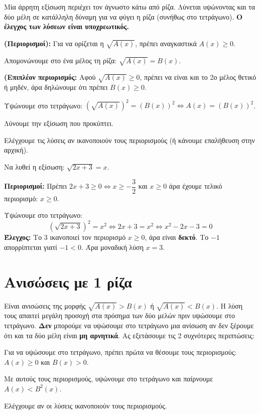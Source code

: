 Μία άρρητη εξίσωση περιέχει τον άγνωστο κάτω από ρίζα.
Λύνεται υψώνοντας και τα δύο μέλη σε κατάλληλη δύναμη για να φύγει η ρίζα (συνήθως στο τετράγωνο). \textbf{Ο έλεγχος των λύσεων είναι υποχρεωτικός.}
\bhmata
\begin{bhma}
    \item \textbf{(Περιορισμοί):} Για να ορίζεται η $\sqrt{A(x)}$, πρέπει αναγκαστικά $A(x) \geq 0$.
    \item Απομονώνουμε στο ένα μέλος τη ρίζα: $\sqrt{A(x)} = B(x)$.
    \item \textbf{(Επιπλέον περιορισμός:} Αφού $\sqrt{A(x)} \geq 0$, πρέπει να είναι και το 2ο μέλος θετικό ή μηδέν, άρα δηλώνουμε ότι πρέπει $B(x) \geq 0$.
    \item Υψώνουμε στο τετράγωνο: $(\sqrt{A(x)})^2 = (B(x))^2 \Leftrightarrow A(x) = (B(x))^2$.
    \item Λύνουμε την εξίσωση που προκύπτει.
    \item Ελέγχουμε τις λύσεις αν ικανοποιούν τους περιορισμούς (ή κάνουμε επαλήθευση στην αρχική).
\end{bhma}


Να λυθεί η εξίσωση: $\sqrt{2x + 3} = x$.

\lysh
\textbf{Περιορισμοί:}
Πρέπει $2x + 3 \geq 0 \Leftrightarrow x \geq -\dfrac{3}{2}$ και $x \geq 0$ άρα έχουμε τελικό περιορισμό: $x \geq 0$.

Υψώνουμε στο τετράγωνο:
\[ (\sqrt{2x + 3})^2 = x^2 \Leftrightarrow 2x + 3 = x^2 \Leftrightarrow x^2 - 2x - 3 = 0 \]
\textbf{Έλεγχος:}
Το 3 ικανοποιεί τον περιορισμό $x \geq 0$, άρα είναι \textbf{δεκτό}.
Το $-1$ απορρίπτεται γιατί $-1 < 0$. Άρα μοναδική λύση $x = 3$.

\section{Ανισώσεις με 1 ρίζα}

Είναι ανισώσεις της μορφής $\sqrt{A(x)} > B(x)$ ή $\sqrt{A(x)} < B(x)$. 
Η λύση τους απαιτεί μεγάλη προσοχή στα πρόσημα των δύο μελών πριν υψώσουμε στο τετράγωνο. \textbf{Δεν} μπορούμε να υψώσουμε στο τετράγωνο μια ανίσωση αν δεν ξέρουμε ότι και τα δύο μέλη είναι \textbf{μη αρνητικά}. Ας εξετάσουμε τις 2 συχνότερες περιπτώσεις:


\bhmata
\begin{bhma}
\item Για να υψώσουμε στο τετράγωνο, πρέπει πρώτα να θέσουμε τους περιορισμούς:
$A(x) \geq 0$ και $B(x) > 0$.
\item Με αυτούς τους περιορισμούς, υψώνουμε στο τετράγωνο και παίρνουμε $A(x) < B^2(x)$.
\item Ελέγχουμε αν οι λύσεις ικανοποιούν τους περιορισμούς.
\end{bhma}


